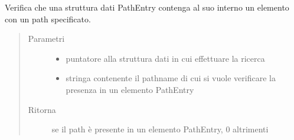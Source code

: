 \documentclass[letterpaper,10pt,italian,openany,oneside]{sphinxmanual}
\begin{document}
\begin{fulllineitems}
\label{\detokenize{code/datastructure:c.containsPath}}
Verifica che una struttura dati PathEntry contenga al suo interno un elemento con un path specificato.
\begin{quote}\begin{description}
\item[{Parametri}] \leavevmode\begin{itemize}
\item {} 
 \textendash{} puntatore alla struttura dati in cui effettuare la ricerca

\item {} 
 \textendash{} stringa contenente il pathname di cui si vuole verificare la presenza in un elemento PathEntry

\end{itemize}

\item[{Ritorna}]  se il path è presente in un elemento PathEntry, 0 altrimenti

\end{description}\end{quote}

\end{fulllineitems}




\renewcommand{\indexname}{Indice}
\printindex
\end{document}
